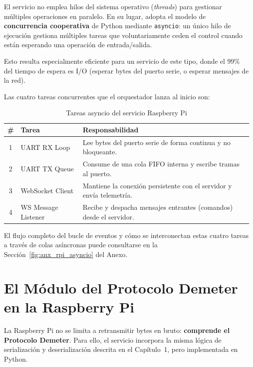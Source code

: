 El servicio no emplea hilos del sistema operativo (\textit{threads}) para gestionar múltiples 
operaciones en paralelo. En su lugar, adopta el modelo de \textbf{concurrencia cooperativa} de 
Python mediante \texttt{asyncio}: un único hilo de ejecución gestiona múltiples tareas que 
voluntariamente ceden el control cuando están esperando una operación de entrada/salida.

Esto resulta especialmente eficiente para un servicio de este tipo, donde el 99\% del tiempo 
de espera es I/O (esperar bytes del puerto serie, o esperar mensajes de la red).

Las cuatro tareas concurrentes que el orquestador lanza al inicio son:

\begin{table}[H]
    \centering
    \caption{Tareas asyncio del servicio Raspberry Pi}
    \begin{tabular}{clp{7cm}}
        \toprule
        \# & \textbf{Tarea} & \textbf{Responsabilidad} \\
        \midrule
        1 & UART RX Loop      & Lee bytes del puerto serie de forma continua y no bloqueante. \\
        2 & UART TX Queue     & Consume de una cola FIFO interna y escribe tramas al puerto. \\
        3 & WebSocket Client  & Mantiene la conexión persistente con el servidor y envía telemetría. \\
        4 & WS Message Listener & Recibe y despacha mensajes entrantes (comandos) desde el servidor. \\
        \bottomrule
    \end{tabular}
    \label{tab:rpi_tasks}
\end{table}

El flujo completo del bucle de eventos y cómo se interconectan estas cuatro tareas a través de 
colas asíncronas puede consultarse en la Sección~\ref{fig:anx_rpi_asyncio} del Anexo.


\section{El Módulo del Protocolo Demeter en la Raspberry Pi}

La Raspberry Pi no se limita a retransmitir bytes en bruto: \textbf{comprende el Protocolo Demeter}. 
Para ello, el servicio incorpora la misma lógica de serialización y deserialización descrita en el 
Capítulo~1, pero implementada en Python.

